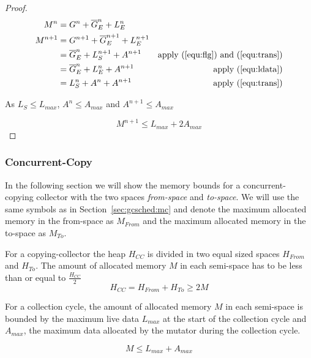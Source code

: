 \begin{proof}
\begin{align}
    M^n & = G^n + \overline{G}_E^n + L_E^n\\
    M^{n+1} & = G^{n+1} + \overline{G}_E^{n+1} + L_E^{n+1}\\
\nonumber
            & = \overline{G}_E^n + L_S^{n+1} + A^{n+1}
                & \mbox{apply (\ref{equ:flg}) and (\ref{equ:trans})}\\
\nonumber
            & = \overline{G}_E^n + L_E^{n} + A^{n+1}
                & \mbox{apply (\ref{equ:ldata})}\\
            & = L_S^{n} + A^n + A^{n+1}
                & \mbox{apply (\ref{equ:trans})}
\end{align}

As $L_S \le L_{max}$, $A^n \le A_{max}$ and $A^{n+1} \le A_{max}$

\begin{equation}
    M^{n+1} \le L_{max} + 2 A_{max}
\end{equation}


\end{proof}

\subsubsection{Concurrent-Copy}

In the following section we will show the memory bounds for a
concurrent-copying collector with the two spaces \emph{from-space}
and \emph{to-space}. We will use the same symbols as in
Section~\ref{sec:gcsched:mc} and denote the maximum allocated memory
in the from-space as $M_{From}$ and the maximum allocated memory in
the to-space as $M_{To}$.

For a copying-collector the heap $H_{CC}$ is divided in two equal
sized spaces $H_{From}$ and $H_{To}$. The amount of allocated memory
$M$ in each semi-space has to be less than or equal to
$\frac{H_{CC}}{2}$
%
\begin{equation}\label{equ:ccheapmin}
    H_{CC} = H_{From} + H_{To} \ge 2M
\end{equation}
%

\begin{lemma}

For a collection cycle, the amount of allocated memory $M$ in each
semi-space is bounded by the maximum live data $L_{max}$ at the start
of the collection cycle and $A_{max}$, the maximum data allocated by
the mutator during the collection cycle.

\begin{equation}\label{equ:cc:lemma}
    M \le L_{max} + A_{max}
\end{equation}

\end{lemma}

